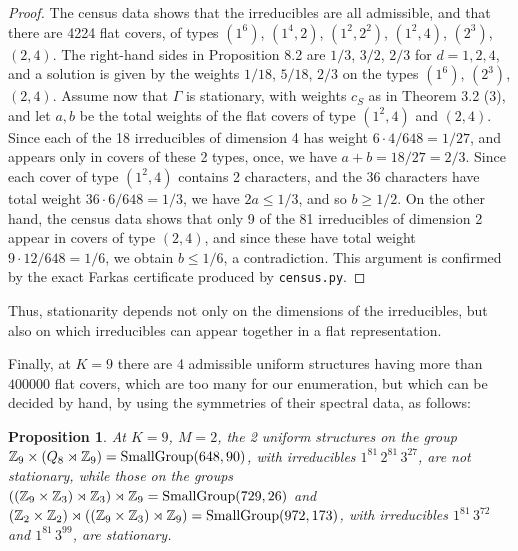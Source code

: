 \documentclass[12pt]{amsart}
\newtheorem{proposition}[theorem]{Proposition}
\theoremstyle{definition}
\begin{document}
\begin{proof}
The census data shows that the irreducibles are all admissible, and that there are 4224 flat covers, of types $(1^6)$, $(1^4,2)$, $(1^2,2^2)$, $(1^2,4)$, $(2^3)$, $(2,4)$. The right-hand sides in Proposition 8.2 are $1/3$, $3/2$, $2/3$ for $d=1,2,4$, and a solution is given by the weights $1/18$, $5/18$, $2/3$ on the types $(1^6)$, $(2^3)$, $(2,4)$. Assume now that $\Gamma$ is stationary, with weights $c_S$ as in Theorem 3.2 (3), and let $a,b$ be the total weights of the flat covers of type $(1^2,4)$ and $(2,4)$. Since each of the 18 irreducibles of dimension 4 has weight $6\cdot4/648=1/27$, and appears only in covers of these 2 types, once, we have $a+b=18/27=2/3$. Since each cover of type $(1^2,4)$ contains 2 characters, and the 36 characters have total weight $36\cdot6/648=1/3$, we have $2a\leq1/3$, and so $b\geq1/2$. On the other hand, the census data shows that only 9 of the 81 irreducibles of dimension 2 appear in covers of type $(2,4)$, and since these have total weight $9\cdot12/648=1/6$, we obtain $b\leq1/6$, a contradiction. This argument is confirmed by the exact Farkas certificate produced by {\tt census.py}.
\end{proof}

Thus, stationarity depends not only on the dimensions of the irreducibles, but also on which irreducibles can appear together in a flat representation.

Finally, at $K=9$ there are 4 admissible uniform structures having more than $400000$ flat covers, which are too many for our enumeration, but which can be decided by hand, by using the symmetries of their spectral data, as follows:

\begin{proposition}
At $K=9$, $M=2$, the 2 uniform structures on the group $\mathbb Z_9\times(Q_8\rtimes\mathbb Z_9)={\rm SmallGroup}(648,90)$, with irreducibles $1^{81}\,2^{81}\,3^{27}$, are not stationary, while those on the groups $((\mathbb Z_9\times\mathbb Z_3)\rtimes\mathbb Z_3)\rtimes\mathbb Z_9={\rm SmallGroup}(729,26)$ and $(\mathbb Z_2\times\mathbb Z_2)\rtimes((\mathbb Z_9\times\mathbb Z_3)\rtimes\mathbb Z_9)={\rm SmallGroup}(972,173)$, with irreducibles $1^{81}\,3^{72}$ and $1^{81}\,3^{99}$, are stationary.
\end{proposition}
\end{document}
